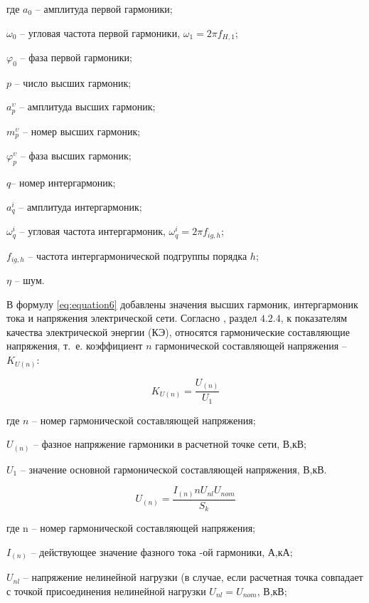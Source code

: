 где $a_{0}$ – амплитуда первой гармоники;

$\omega_{0}$ – угловая частота первой гармоники, $\omega_{1} = 2 \pi f_{H,1}$;

$\varphi_{0}$ – фаза первой гармоники; 

$p$ – число высших гармоник;

$a_p^{\upsilon}$ – амплитуда высших гармоник;

$m_p^{\upsilon}$ – номер высших гармоник;

$\varphi_p^{\upsilon}$ – фаза высших гармоник;

$q$– номер интергармоник;

$a_q^i$ – амплитуда интергармоник;

$\omega_q^i$ – угловая частота интергармоник, $\omega_q^i=2\pi f_{ig,h}$; 

$f_{ig,h}$ – частота интергармонической подгруппы порядка $h$;

$\eta$ – шум.

В формулу \ref{eq:equation6} добавлены значения высших гармоник, интергармоник тока и напряжения электрической сети.
Согласно \cite{GOST32144-2013}, раздел $4.2.4$, к показателям качества электрической энергии (КЭ), относятся гармонические составляющие напряжения, т.~е. коэффициент  $n$ гармонической составляющей напряжения – $K_{U(n)}$:

\begin{equation}
	\label{eq:equation7}
	K_{U(n)} = \frac{U_{(n)}}{U_1}
\end{equation}

где $n$ – номер гармонической составляющей напряжения;

$U_{(n)}$ – фазное напряжение гармоники в расчетной точке сети, В,кВ;

$U_1$ – значение основной гармонической составляющей напряжения, В,кВ.

\begin{equation}
	\label{eq:equation8}
	U_(n) = \frac{I_{(n)} n U_{nl} U_{nom}}{S_k}
\end{equation}

где n – номер гармонической составляющей напряжения;

$I_{(n)}$ – действующее значение фазного тока -ой гармоники, А,кА;

$U_{nl}$ – напряжение нелинейной нагрузки (в случае, если расчетная точка совпадает с точкой присоединения нелинейной нагрузки $U_{nl} = U_{nom}$, В,кВ;

